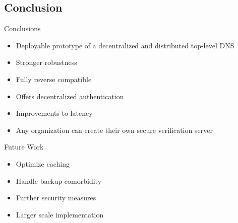 \documentclass[11pt]{beamer}
\begin{document}
\subsection{Conclusion}
\begin{frame}{Conclusions}
	\begin{itemize}
		\item Deployable prototype of a decentralized and distributed top-level DNS
		\item Stronger robustness
		\item Fully reverse compatible
		\item Offers decentralized authentication
		\item Improvements to latency
		\item Any organization can create their own secure verification server
		
	\end{itemize}
\end{frame}



\begin{frame}{Future Work}
	\begin{itemize}
		\item Optimize caching
		\item Handle backup comorbidity 
		\item Further security measures
		\item Larger scale implementation 
	\end{itemize}
\end{frame}



%
\end{document}
